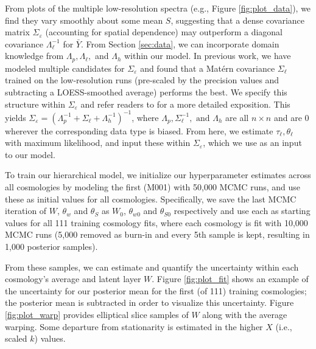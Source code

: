 \documentclass[11pt]{article}
\begin{document}
From plots of the multiple low-resolution spectra (e.g., Figure \ref{fig:plot_data}), 
we find they vary smoothly about some mean $S$, suggesting that a dense covariance 
matrix $\Sigma_\varepsilon$ (accounting for spatial dependence) may outperform a 
diagonal covariance $\Lambda_\ell^{-1}$ for $\bar Y$. From Section \ref{sec:data},
we can incorporate domain knowledge from $\Lambda_p, \Lambda_\ell,$ and $\Lambda_h$ 
within our model. In previous work, we have modeled multiple candidates for 
$\Sigma_\varepsilon$ \citep{walsh2023bayesian} and found that a Mat\'ern covariance 
$\Sigma_\ell$ trained on the low-resolution runs (pre-scaled by the precision 
values and subtracting a LOESS-smoothed average) performs the best. 
We specify this structure within $\Sigma_\varepsilon$ and refer readers 
to \cite{walsh2023bayesian} for a more detailed exposition. This yields 
$\Sigma_\varepsilon=\left(\Lambda_p^{-1} + \Sigma_\ell + \Lambda_h^{-1}\right)^{-1}$, 
where $\Lambda_p, \Sigma_\ell^{-1}, \text{ and } \Lambda_h$ are all $n\times n$ 
and are 0 wherever the corresponding data type is biased. From here, we estimate 
$\tau_\ell, \theta_\ell$ with maximum likelihood, and input these within 
$\Sigma_\varepsilon$, which we use as an input to our model.

To train our hierarchical model, we initialize our hyperparameter estimates across 
all cosmologies by modeling the first (M001) with 50,000 MCMC runs, and use these 
as initial values for all cosmologies. Specifically, we save the last MCMC 
iteration of $W$, $\theta_w$ and $\theta_S$ as $W_0$, $\theta_{w0}$ and $\theta_{S0}$ 
respectively and use each as starting values for all 111 training cosmology fits, 
where each cosmology is fit with 10,000 MCMC runs (5,000 removed as burn-in and 
every 5th sample is kept, resulting in 1,000 posterior samples).

From these samples, we can estimate and quantify the uncertainty within each 
cosmology's average and latent layer $W$. Figure \ref{fig:plot_fit} shows an 
example of the uncertainty for our posterior mean for the first (of 111) training 
cosmologies; the posterior mean is subtracted in order to visualize this uncertainty. 
Figure \ref{fig:plot_warp} provides elliptical slice samples of $W$ along with the 
average warping. Some departure from stationarity is estimated in the higher $X$ 
(i.e., scaled $k$) values.
\end{document}
